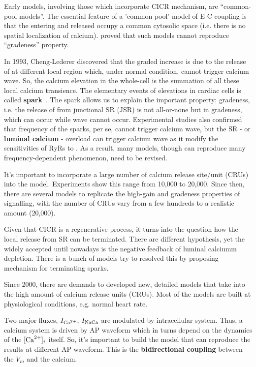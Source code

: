 Early models, involving those which incorporate CICR mechanism, are
``common-pool models''. The essential feature of a 'common pool' model
of E-C coupling is that the entering  and released
 occupy a common cytosolic space (i.e. there is no spatial
localization of calcium). \citep{stern1992tec} proved that
such models cannot reproduce ``gradeness'' property. 
 

In 1993, Cheng-Lederer discovered that the graded increase is due to
the release of  at different local region which, under
normal condition, cannot trigger calcium wave.  So, the calcium
elevation in the whole-cell is the summation of all these local
calcium transience.  The elementary events of  elevations in
cardiac cells is called {\bf {} spark}~\citep{cheng1993cse}.
The  spark allows us to explain the important property:
gradeness, i.e. the release of  from junctional SR (JSR) is
not all-or-none but in gradeness, which can occur while 
wave cannot occur. Experimental studies also confirmed that frequency
of the sparks, per se, cannot trigger calcium wave, but the SR 
- or {\bf luminal calcium} - overload can trigger calcium wave as it
modify the sensitivities of RyRs to . As a result, many
models, though can reproduce many frequency-dependent phenomenon, need
to be revised.

It's important to incorporate a large number of calcium release site/unit (CRUs)
into the model. Experiments show this range from 10,000 to 20,000. Since then,
there are several models to replicate the high-gain and gradeness properties of
 signalling, with the number of CRUs vary from a few hundreds to a
realistic amount (20,000).

Given that CICR is a regenerative process, it turns into the question how the
local  release from SR can be terminated. There are different
hypothesis, yet the widely accepted until nowadays is the negative feedback of
luminal calciumm depletion. There is a bunch of models try to resolved this by
proposing mechanism for terminating  sparks.

Since 2000, there are demands to developed new, detailed models that
take into the high amount of calcium release units (CRUs).  Most of
the models are built at physiological conditions, e.g. normal heart
rate. 

Two major fluxes, $I_{\text{Ca}^{2+}}$, $I_{\text{NaCa}}$ are modulated by intracellular
system. Thus, a calcium system is driven by AP waveform which in turns
depend on the dynamics of the $[\ce{Ca^2+}]_i$ itself. So, it's important to
build the model that can reproduce the results at different AP
waveform. This is the {\bf bidirectional coupling} between the $V_m$ and the
calcium.

